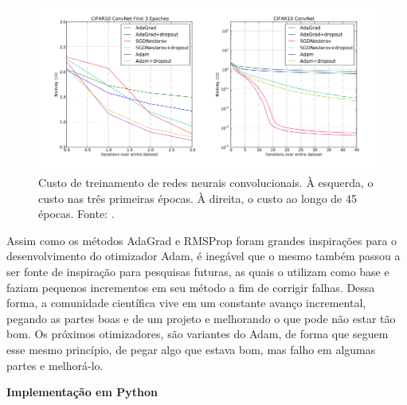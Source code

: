 \begin{figure}[h]
    \centering
    \includegraphics[width=0.85\linewidth]{../imagens/retropropagacao-gradiente/comparativo-adam-convnet.png}
    
    \caption[Custo de treinamento de redes neurais convolucionais]{%
        Custo de treinamento de redes neurais convolucionais. À esquerda, o custo nas três primeiras épocas. À direita, o custo ao longo de 45 épocas.
        \newline
        \small Fonte: \parencite{AdamMethod}.
    }
    \label{fig:comparativo-adam-convnet}
\end{figure}

Assim como os métodos AdaGrad e RMSProp foram grandes inspirações para o desenvolvimento do otimizador Adam, é inegável que o mesmo também passou a ser fonte de inspiração para pesquisas futuras, as quais o utilizam como base e faziam pequenos incrementos em seu método a fim de corrigir falhas. Dessa forma, a comunidade científica vive em um constante avanço incremental, pegando as partes boas e de um projeto e melhorando o que pode não estar tão bom. Os próximos otimizadores, são variantes do Adam, de forma que seguem esse mesmo princípio, de pegar algo que estava bom, mas falho em algumas partes e melhorá-lo.

\textbf{Implementação em Python}

